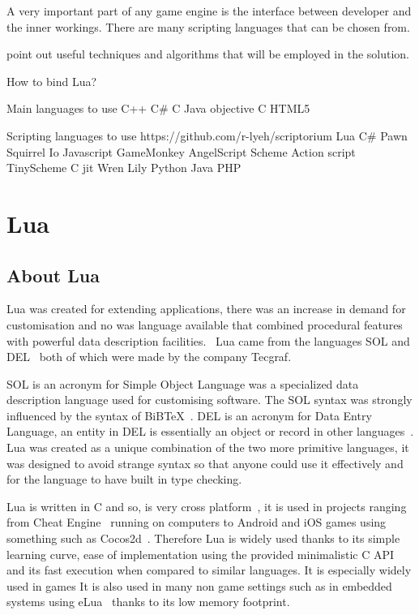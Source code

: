 \documentclass[11pt,a4paper,titlepage]{article}
\begin{document}
	A very important part of any game engine is the interface between developer and the inner workings. There are many scripting languages that can be chosen from.
	
	point out useful techniques and algorithms that will be employed in the solution. 
		
	How to bind Lua?
			

	\newpage

	Main languages to use
	C++
	C\#
	C
	Java
	objective C
	HTML5
	
	Scripting languages to use https://github.com/r-lyeh/scriptorium
		Lua
		C\# %
		Pawn
		Squirrel
		Io
		Javascript
		GameMonkey
		AngelScript
		Scheme
		Action script
		TinyScheme
		C jit
		Wren
		Lily
		Python
		Java
		PHP

	\newpage

\section{Lua}

\subsection{About Lua}
	Lua was created for extending applications, there was an increase in demand for customisation and no was language available that combined procedural features with powerful data description facilities.~\cite{Ierusalimschy02software} Lua came from the languages SOL and DEL~\cite{Ierusalimschy01theevolution} both of which were made by the company Tecgraf.
	
	SOL is an acronym for Simple Object Language was a specialized data description language used for customising software. The SOL syntax was strongly influenced by the syntax of BiBTeX~\cite{Lamport:1989:LDP:63364}. DEL is an acronym for Data Entry Language, an entity in DEL is essentially an object or record in other languages~\cite{Ierusalimschy01theevolution}. Lua was created as a unique combination of the two more primitive languages, it was designed to avoid strange syntax so that anyone could use it effectively and for the language to have built in type checking.
	
	Lua is written in C and so, is very cross platform~\cite{LuaSource}, it is used in projects ranging from Cheat Engine~\cite{CheatEngine} running on computers to Android and iOS games using something such as Cocos2d~\cite{COCOS2D}. Therefore Lua is widely used thanks to its simple learning curve, ease of implementation using the provided minimalistic C API and its fast execution when compared to similar languages. It is especially widely used in games It is also used in many non game settings such as in embedded systems using eLua~\cite{eLua} thanks to its low memory footprint.
		
\end{document}

